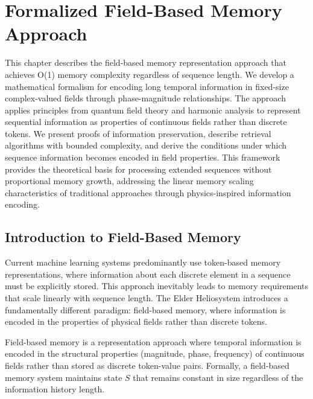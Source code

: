 \chapter{Formalized Field-Based Memory Approach}

\begin{tcolorbox}[colback=DarkSkyBlue!5!white,colframe=DarkSkyBlue!75!black,title=Chapter Summary]
This chapter describes the field-based memory representation approach that achieves O(1) memory complexity regardless of sequence length. We develop a mathematical formalism for encoding long temporal information in fixed-size complex-valued fields through phase-magnitude relationships. The approach applies principles from quantum field theory and harmonic analysis to represent sequential information as properties of continuous fields rather than discrete tokens. We present proofs of information preservation, describe retrieval algorithms with bounded complexity, and derive the conditions under which sequence information becomes encoded in field properties. This framework provides the theoretical basis for processing extended sequences without proportional memory growth, addressing the linear memory scaling characteristics of traditional approaches through physics-inspired information encoding.
\end{tcolorbox}

\section{Introduction to Field-Based Memory}

Current machine learning systems predominantly use token-based memory representations, where information about each discrete element in a sequence must be explicitly stored. This approach inevitably leads to memory requirements that scale linearly with sequence length. The Elder Heliosystem introduces a fundamentally different paradigm: field-based memory, where information is encoded in the properties of physical fields rather than discrete tokens.

\begin{definition}
Field-based memory is a representation approach where temporal information is encoded in the structural properties (magnitude, phase, frequency) of continuous fields rather than stored as discrete token-value pairs. Formally, a field-based memory system maintains state $S$ that remains constant in size regardless of the information history length.
\end{definition}

